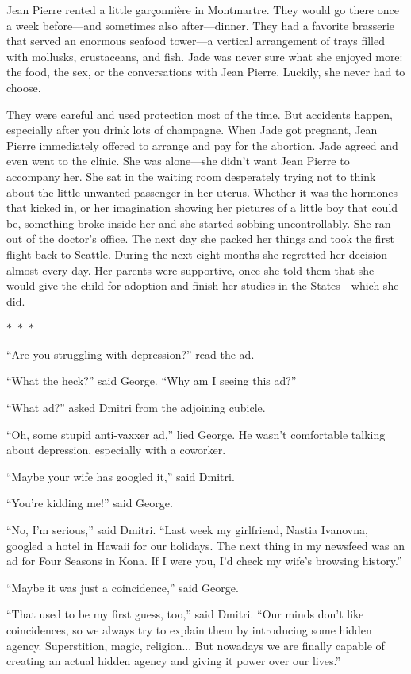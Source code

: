 \documentclass{memoir}
\newcommand{\starbreak}{%
\begin{center}
  $\ast$~$\ast$~$\ast$
\end{center}
}
\begin{document}
Jean Pierre rented a little garçonnière in Montmartre. They would go there once a week before---and sometimes also after---dinner. They had a favorite brasserie that served an enormous seafood tower---a vertical arrangement of trays filled with mollusks, crustaceans, and fish. Jade was never sure what she enjoyed more: the food, the sex, or the conversations with Jean Pierre. Luckily, she never had to choose. 

They were careful and used protection most of the time. But accidents happen, especially after you drink lots of champagne. When Jade got pregnant, Jean Pierre immediately offered to arrange and pay for the abortion. Jade agreed and even went to the clinic. She was alone---she didn't want Jean Pierre to accompany her. She sat in the waiting room desperately trying not to think about the little unwanted passenger in her uterus. Whether it was the hormones that kicked in, or her imagination showing her pictures of a little boy that could be, something broke inside her and she started sobbing uncontrollably. She ran out of the doctor's office. The next day she packed her things and took the first flight back to Seattle. During the next eight months she regretted her decision almost every day. Her parents were supportive, once she told them that she would give the child for adoption and finish her studies in the States---which she did. 

\starbreak

``Are you struggling with depression?'' read the ad. 

``What the heck?'' said George. ``Why am I seeing this ad?''

``What ad?'' asked Dmitri from the adjoining cubicle. 

``Oh, some stupid anti-vaxxer ad,'' lied George. He wasn't comfortable talking about depression, especially with a coworker.

``Maybe your wife has googled it,'' said Dmitri.

``You're kidding me!'' said George.

``No, I'm serious,'' said Dmitri. ``Last week my girlfriend, Nastia Ivanovna, googled a hotel in Hawaii for our holidays. The next thing in my newsfeed was an ad for Four Seasons in Kona. If I were you, I'd check my wife's browsing history.''

``Maybe it was just a coincidence,'' said George.

``That used to be my first guess, too,'' said Dmitri. ``Our minds don't like coincidences, so we always try to explain them by introducing some hidden agency. Superstition, magic, religion... But nowadays we are finally capable of creating an actual hidden agency and giving it power over our lives.''
\end{document}
